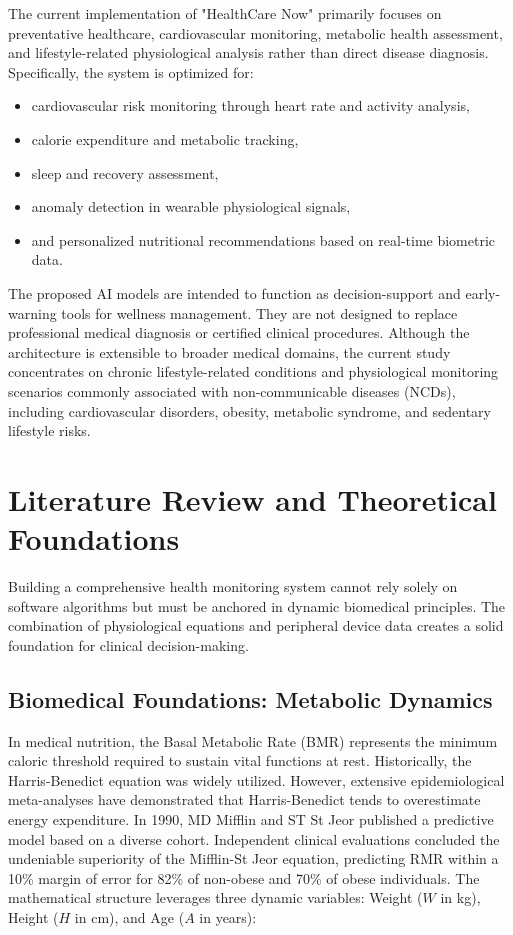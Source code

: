 \documentclass[journal, a4paper]{IEEEtran}
\begin{document}
The current implementation of "HealthCare Now" primarily focuses on preventative healthcare, cardiovascular monitoring, metabolic health assessment, and lifestyle-related physiological analysis rather than direct disease diagnosis. Specifically, the system is optimized for:
\begin{itemize}
    \item cardiovascular risk monitoring through heart rate and activity analysis,
    \item calorie expenditure and metabolic tracking,
    \item sleep and recovery assessment,
    \item anomaly detection in wearable physiological signals,
    \item and personalized nutritional recommendations based on real-time biometric data.
\end{itemize}
The proposed AI models are intended to function as decision-support and early-warning tools for wellness management. They are not designed to replace professional medical diagnosis or certified clinical procedures. Although the architecture is extensible to broader medical domains, the current study concentrates on chronic lifestyle-related conditions and physiological monitoring scenarios commonly associated with non-communicable diseases (NCDs), including cardiovascular disorders, obesity, metabolic syndrome, and sedentary lifestyle risks.

\section{Literature Review and Theoretical Foundations}
\label{sec:theory}

Building a comprehensive health monitoring system cannot rely solely on software algorithms but must be anchored in dynamic biomedical principles. The combination of physiological equations and peripheral device data creates a solid foundation for clinical decision-making.

\subsection{Biomedical Foundations: Metabolic Dynamics}
In medical nutrition, the Basal Metabolic Rate (BMR) represents the minimum caloric threshold required to sustain vital functions at rest. Historically, the Harris-Benedict equation was widely utilized. However, extensive epidemiological meta-analyses have demonstrated that Harris-Benedict tends to overestimate energy expenditure. In 1990, MD Mifflin and ST St Jeor published a predictive model based on a diverse cohort. Independent clinical evaluations concluded the undeniable superiority of the Mifflin-St Jeor equation, predicting RMR within a 10\% margin of error for 82\% of non-obese and 70\% of obese individuals. The mathematical structure leverages three dynamic variables: Weight ($W$ in kg), Height ($H$ in cm), and Age ($A$ in years):
\end{document}
